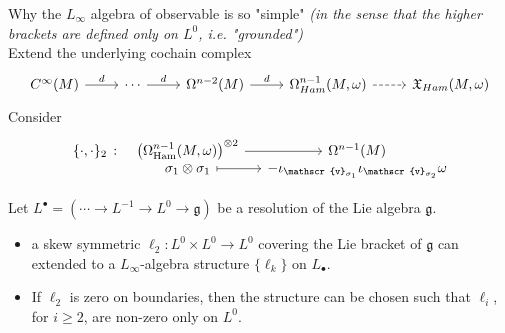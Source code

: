 \documentclass[beamer,10pt]{standalone}
\begin{document}
\begin{frame}[fragile]{Why the $L_\infty$ algebra of observable is so "simple"}
	\textit{(in the sense that the higher brackets are defined only on $L^0$, i.e. "grounded")}
	 \\
	 \vfill
	Extend the underlying cochain complex
	\begin{displaymath}
		\begin{tikzcd}
			C^{\infty}(M) \ar[r,"d"] &
			\cdots \ar[r,"d"] &
			\Omega^{n-2}(M) \ar[r,"d"] &
			\Omega^{n-1}_{Ham}(M,\omega) \ar[r,dashed] &
			\mathfrak{X}_{Ham}(M,\omega)
		\end{tikzcd}
	\end{displaymath}
	Consider 
	\begin{displaymath}
		\begin{tikzcd}[column sep= small,row sep=0ex]
			\{\cdot,\cdot\}_2 ~\colon&[-1em] \left(\Omega^{n-1}_{\textrm{Ham}}(M,\omega)\right)^{\otimes 2} 	\arrow[r]& 				\Omega^{n-1}(M) \\[-1ex]
			& \sigma_1\otimes\sigma_1 	\ar[r, mapsto]& 	-
			\iota_{\mathscr{v}_{\sigma_1}}\iota_{\mathscr{v}_{\sigma_2}}\omega 
		\end{tikzcd}
	\end{displaymath}
	\vfill
	\begin{thmblock}
		 Let $L^\bullet = (\cdots \rightarrow L^{-1} \rightarrow L^0 \rightarrow \mathfrak{g})$ be a resolution of the Lie
		algebra $\mathfrak{g}$.
		\begin{itemize}
			\item a skew symmetric $\ell_2:L^0\times L^0 \to L^0$ covering the Lie bracket of $\mathfrak{g}$ can extended to a $L_\infty$-algebra structure $\{\ell_k\}$ on $L_\bullet$.
			\item If $\ell_2$ is zero on boundaries, then the structure can be chosen such that $\ell_i$, for $i\geq 2$, are non-zero only on $L^0$.
		\end{itemize}
	\end{thmblock}


\end{frame}
\end{document}
